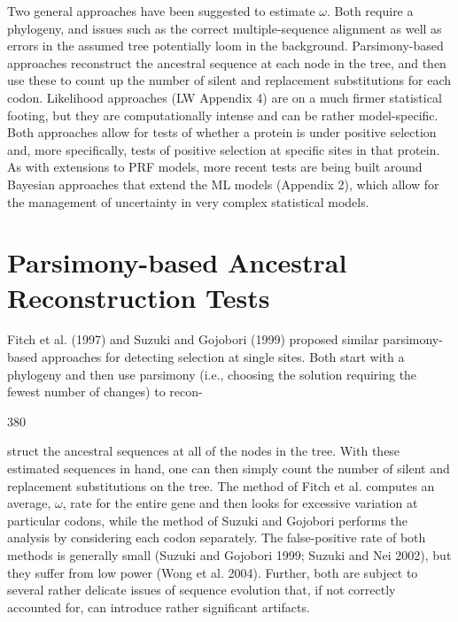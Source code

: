 \documentclass{article}
\begin{document}
Two general approaches have been suggested to estimate  $ \omega $. Both require a phylogeny, and issues such as the correct multiple-sequence alignment as well as errors in the assumed tree potentially loom in the background. Parsimony-based approaches reconstruct the ancestral sequence at each node in the tree, and then use these to count up the number of silent and replacement substitutions for each codon. Likelihood approaches (LW Appendix 4) are on a much firmer statistical footing, but they are computationally intense and can be rather model-specific. Both approaches allow for tests of whether a protein is under positive selection and, more specifically, tests of positive selection at specific sites in that protein. As with extensions to PRF models, more recent tests are being built around Bayesian approaches that extend the ML models (Appendix 2), which allow for the management of uncertainty in very complex statistical models.

\section{Parsimony-based Ancestral Reconstruction Tests}
Fitch et al. (1997) and Suzuki and Gojobori (1999) proposed similar parsimony-based approaches for detecting selection at single sites. Both start with a phylogeny and then use parsimony (i.e., choosing the solution requiring the fewest number of changes) to recon-

380

struct the ancestral sequences at all of the nodes in the tree. With these estimated sequences in hand, one can then simply count the number of silent and replacement substitutions on the tree. The method of Fitch et al. computes an average,  $ \omega $, rate for the entire gene and then looks for excessive variation at particular codons, while the method of Suzuki and Gojobori performs the analysis by considering each codon separately. The false-positive rate of both methods is generally small (Suzuki and Gojobori 1999; Suzuki and Nei 2002), but they suffer from low power (Wong et al. 2004). Further, both are subject to several rather delicate issues of sequence evolution that, if not correctly accounted for, can introduce rather significant artifacts.
\end{document}
